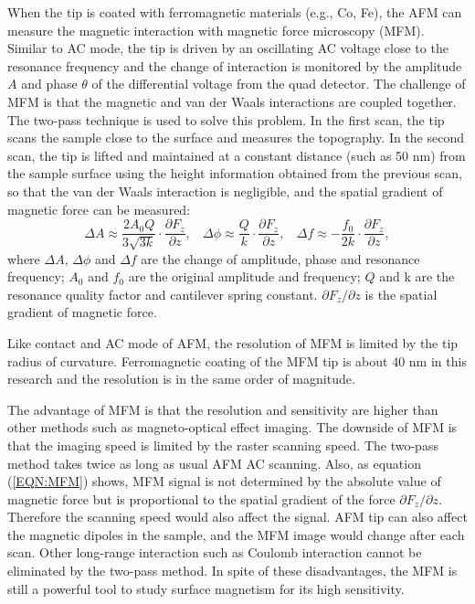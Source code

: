 \documentclass[pdflatex, sectionletters, 12pt]{pittetd}    %
\begin{document}
When the tip is coated with ferromagnetic materials (e.g., Co, Fe), the AFM can measure the magnetic interaction with magnetic force microscopy (MFM). Similar to AC mode, the tip is driven by an oscillating AC voltage close to the resonance frequency and the change of interaction is monitored by the amplitude $A$ and phase $\theta$ of the differential voltage from the quad detector. The challenge of MFM is that the magnetic and van der Waals interactions are coupled together. The two-pass technique is used to solve this problem. In the first scan, the tip scans the sample close to the surface and measures the topography. In the second scan, the tip is lifted and maintained at a constant distance (such as 50 nm) from the sample surface using the height information obtained from the previous scan, so that the van der Waals interaction is negligible, and the spatial gradient of magnetic force can be measured\cite{hartmann1999magnetic}:
\begin{equation}
\label{EQN:MFM}
\Delta A \approx \frac{2 A_0 Q}{3\sqrt{3k}} \cdot \frac{\partial F_z}{\partial z}, \ \ \ \
\Delta \phi \approx \frac{Q}{k} \cdot \frac{\partial F_z}{\partial z}, \ \ \ \
\Delta f \approx -\frac{f_0}{2k} \cdot \frac{\partial F_z}{\partial z}, 
\end{equation}
where $\Delta A$, $\Delta \phi$ and $\Delta f$ are the change of amplitude, phase and resonance frequency; $A_0$ and $f_0$ are the original amplitude and frequency; $Q$ and k are the resonance quality factor and cantilever spring constant. $\partial F_z/\partial z$ is the spatial gradient of magnetic force. 

Like contact and AC mode of AFM, the resolution of MFM is limited by the tip radius of curvature. Ferromagnetic coating of the MFM tip is about 40 nm in this research and the resolution is in the same order of magnitude. 

The advantage of MFM is that the resolution and sensitivity are higher than other methods such as magneto-optical effect imaging. The downside of MFM is that the imaging speed is limited by the raster scanning speed. The two-pass method takes twice as long as usual AFM AC scanning. Also, as equation (\ref{EQN:MFM}) shows, MFM signal is not determined by the absolute value of magnetic force but is proportional to the spatial gradient of the force $\partial F_z/\partial z$. Therefore the scanning speed would also affect the signal. AFM tip can also affect the magnetic dipoles in the sample, and the MFM image would change after each scan. Other long-range interaction such as Coulomb interaction cannot be eliminated by the two-pass method. In spite of these disadvantages, the MFM is still a powerful tool to study surface magnetism for its high sensitivity.
\\
\end{document}
